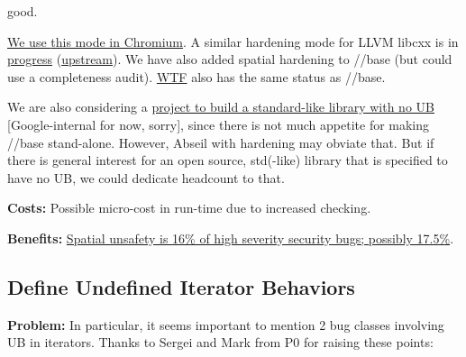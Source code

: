 \documentclass[a4paper,12pt,notitlepage,twoside,openright]{article}
\begin{document}
good. {\href{https://www.google.com/url?q=https://source.chromium.org/chromium/chromium/src/\%2B/main:third_party/abseil-cpp/absl_hardening_test.cc;l\%3D19?q\%3Dabsl_harden\%26ss\%3Dchromium\&sa=D\&source=editors\&ust=1631944129051000\&usg=AOvVaw0cHRqJzTxMfueFZGG_xz-J}{We
use }\href{https://www.google.com/url?q=https://source.chromium.org/chromium/chromium/src/\%2B/main:third_party/abseil-cpp/absl_hardening_test.cc;l\%3D19?q\%3Dabsl_harden\%26ss\%3Dchromium\&sa=D\&source=editors\&ust=1631944129052000\&usg=AOvVaw1jFEYauM_cOOMNfTUUADa6}{this
mode in Chromium}. A similar hardening mode for LLVM libcxx is
in \href{https://www.google.com/url?q=https://bugs.chromium.org/p/chromium/issues/detail?id\%3D923166\&sa=D\&source=editors\&ust=1631944129053000\&usg=AOvVaw2CgUfuKxGKgWkZIOQ3Nq9y}{progress} (\href{https://www.google.com/url?q=https://reviews.llvm.org/D89353\&sa=D\&source=editors\&ust=1631944129053000\&usg=AOvVaw3JKAAvS4gV2e6p1iXVACSs}{upstream}).
We have also added spatial hardening to //base (but could use a
completeness
audit). \href{https://www.google.com/url?q=https://source.chromium.org/chromium/chromium/src/\%2B/main:third_party/blink/renderer/platform/wtf/\&sa=D\&source=editors\&ust=1631944129053000\&usg=AOvVaw0kkd5EAIlI1FKFlepB4rBL}{WTF} also
has the same status as //base.

We are
also considering a \href{https://www.google.com/url?q=https://github.com/chromium/libboring\&sa=D\&source=editors\&ust=1631944129054000\&usg=AOvVaw0Wl6dhQfxK9NJixftXrm63}{project
to build a standard-like library with no UB} {[}Google-internal for
now, sorry{]}, since there is not much appetite for making //base
stand-alone. However, Abseil with hardening may obviate that. But if
there is general interest for an open source, std(-like) library that is
specified to have no UB, we could dedicate headcount to that.

\textbf{Costs:} Possible micro-cost in run-time due to increased
checking.

\textbf{Benefits:} \href{https://docs.google.com/document/d/e/2PACX-1vRZr-HJcYmf2Y76DhewaiJOhRNpjGHCxliAQTBhFxzv1QTae9o8mhBmDl32CRIuaWZLt5kVeH9e9jXv/pub\#h.eoikp3r0cwlf}{Spatial
unsafety is 16\% of high severity security bugs; possibly 17.5\%}.

\subsection{Define Undefined Iterator Behaviors}

\textbf{Problem:} In particular, it seems important to mention 2 bug
classes involving UB in iterators. Thanks to Sergei and Mark from P0 for
raising these points:

}
\end{document}
